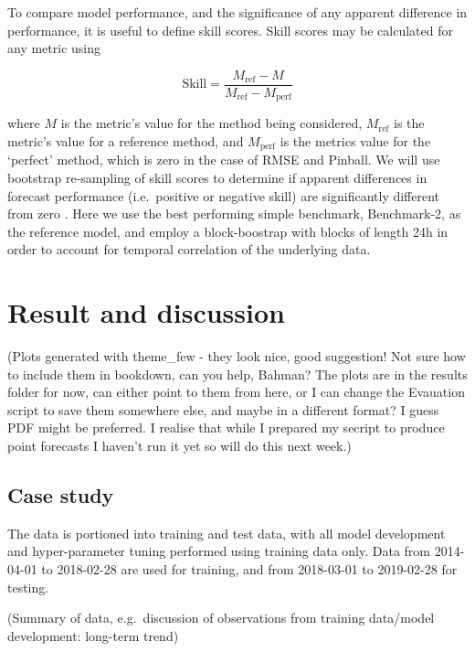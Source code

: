 \documentclass[]{elsarticle} %
\begin{document}
To compare model performance, and the significance of any apparent difference in performance, it is useful to define skill scores. Skill scores may be calculated for any metric using

\begin{equation}
     \text{Skill} = \frac{M_\text{ref} - M}{M_\text{ref} - M_\text{perf}} \label{eq:skillscore}
\end{equation}

where \(M\) is the metric's value for the method being considered, \(M_\text{ref}\) is the metric's value for a reference method, and \(M_\text{perf}\) is the metrics value for the `perfect' method, which is zero in the case of RMSE and Pinball. We will use bootstrap re-sampling of skill scores to determine if apparent differences in forecast performance (i.e.~positive or negative skill) are significantly different from zero \citep{Efron1981Bootstrap}. Here we use the best performing simple benchmark, Benchmark-2, as the reference model, and employ a block-boostrap with blocks of length 24h in order to account for temporal correlation of the underlying data.

\hypertarget{result}{%
\section{Result and discussion}\label{result}}

(Plots generated with theme\_few - they look nice, good suggestion! Not sure how to include them in bookdown, can you help, Bahman? The plots are in the results folder for now, can either point to them from here, or I can change the Evauation script to save them somewhere else, and maybe in a different format? I guess PDF might be preferred. I realise that while I prepared my secript to produce point forecasts I haven't run it yet so will do this next week.)

\hypertarget{case-study}{%
\subsection{Case study}\label{case-study}}

The data is portioned into training and test data, with all model development and hyper-parameter tuning performed using training data only. Data from 2014-04-01 to 2018-02-28 are used for training, and from 2018-03-01 to 2019-02-28 for testing.

(Summary of data, e.g.~discussion of observations from training data/model development: long-term trend)
\end{document}
